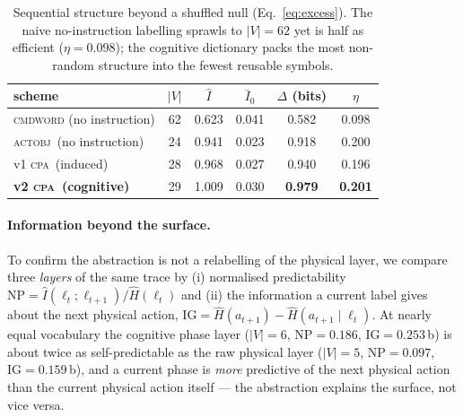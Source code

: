 \documentclass[11pt]{article}
\newcommand{\cpa}{\textsc{cpa}}
\begin{document}
\begin{table}[t]
\centering
\begin{tabular}{l c c c c c}
\toprule
scheme & $|V|$ & $\hat I$ & $\bar I_0$ & $\Delta$ (bits) & $\eta$ \\
\midrule
\textsc{cmdword} (no instruction) & 62 & 0.623 & 0.041 & 0.582 & 0.098 \\
\textsc{actobj}\ (no instruction) & 24 & 0.941 & 0.023 & 0.918 & 0.200 \\
v1 \cpa\ (induced)                & 28 & 0.968 & 0.027 & 0.940 & 0.196 \\
\textbf{v2 \cpa\ (cognitive)}     & 29 & 1.009 & 0.030 & \textbf{0.979} & \textbf{0.201} \\
\bottomrule
\end{tabular}
\caption{Sequential structure beyond a shuffled null (Eq.~\ref{eq:excess}). The naive
no-instruction labelling sprawls to $|V|=62$ yet is half as efficient ($\eta=0.098$); the
cognitive dictionary packs the most non-random structure into the fewest reusable symbols.}
\label{tab:ladder}
\end{table}

\paragraph{Information beyond the surface.}
To confirm the abstraction is not a relabelling of the physical layer, we compare three
\emph{layers} of the same trace by (i) normalised predictability
$\mathrm{NP}=\hat I(\ell_t;\ell_{t+1})/\hat H(\ell_t)$ and (ii) the information a current label
gives about the next physical action,
$\mathrm{IG}=\hat H(a_{t+1})-\hat H(a_{t+1}\mid \ell_t)$. At nearly equal vocabulary the
cognitive phase layer ($|V|{=}6$, $\mathrm{NP}{=}0.186$, $\mathrm{IG}{=}0.253$\,b) is about
twice as self-predictable as the raw physical layer ($|V|{=}5$, $\mathrm{NP}{=}0.097$,
$\mathrm{IG}{=}0.159$\,b), and a current phase is \emph{more} predictive of the next physical
action than the current physical action itself --- the abstraction explains the surface,
not vice versa.
\end{document}
